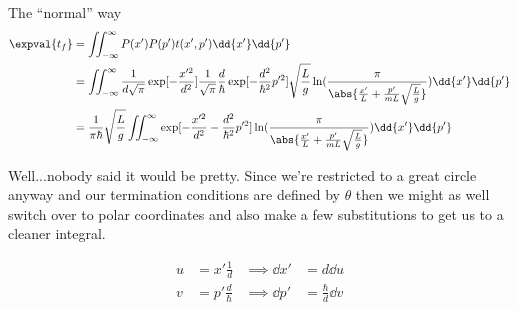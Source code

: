 \begin{answer}
\begin{answerpart}{The ``normal'' way}
    \begin{equation}
      \begin{split}
        \expval{t_f}
        &= \iint_{-\infty}^{\infty} P(x')P(p')t(x', p') \dd{x'} \dd{p'}
        \\
        &= \iint_{-\infty}^{\infty}
        \frac{1}{d\sqrt{\pi}} \exp[-\frac{x'^{2}}{d^2}]
        \frac{1}{\sqrt{\pi}} \frac{d}{\hbar} \exp[-\frac{d^2}{\hbar^2}p'^2]
        \sqrt{\frac{L}{g}}\ln(\frac{\pi}{\abs{\frac{x'}{L} + \frac{p'}{mL}\sqrt{\frac{L}{g}}}})
        \dd{x'} \dd{p'}
        \\
        &=
        \frac{1}{\pi\hbar}
        \sqrt{\frac{L}{g}}
        \iint_{-\infty}^{\infty}
        \exp[-\frac{x'^{2}}{d^2} - \frac{d^2}{\hbar^2}p'^2]
        \ln(\frac{\pi}{\abs{\frac{x'}{L} + \frac{p'}{mL}\sqrt{\frac{L}{g}}}})
        \dd{x'} \dd{p'}
        \\
      \end{split}
    \end{equation}

    Well...nobody said it would be pretty. Since we're restricted to a
    great circle anyway and our termination conditions are defined by
    $\theta$ then we might as well switch over to polar coordinates
    and also make a few substitutions to get us to a cleaner integral.

    \begin{equation}
      \begin{alignedat}{2}
        u &= x'\frac{1}{d} &\implies \dd{x'} &= d \dd{u}\\
        v &= p'\frac{d}{\hbar} &\implies \dd{p'} &= \frac{\hbar}{d} \dd{v}\\
      \end{alignedat}
    \end{equation}


\end{answerpart}
\end{answer}
